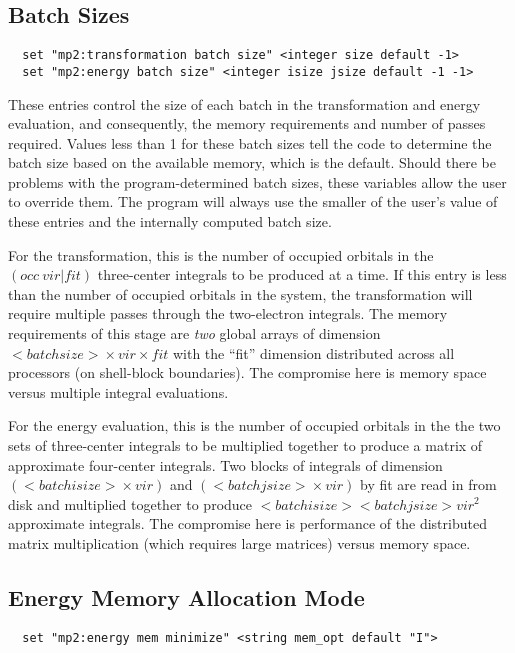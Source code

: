 \subsection{Batch Sizes}

\begin{verbatim}
  set "mp2:transformation batch size" <integer size default -1>
  set "mp2:energy batch size" <integer isize jsize default -1 -1>
\end{verbatim}

These entries control the size of each batch in the transformation and
energy evaluation, and consequently, the memory requirements and
number of passes required.  Values less than 1 for these batch sizes
tell the code to determine the batch size based on the available
memory, which is the default.  Should there be problems with the
program-determined batch sizes, these variables allow the user to
override them.  The program will always use the smaller of the user's
value of these entries and the internally computed batch size.

For the transformation, this is the number of occupied orbitals in the
$({occ}\ {vir} | {fit})$ three-center integrals to
be produced at a time.  If this entry is less than the number of occupied
orbitals in the system, the transformation will require multiple
passes through the two-electron integrals.  The memory requirements of
this stage are {\em two} global arrays of dimension ${<batch
size>}\times {vir} \times {fit}$ with the ``fit''
dimension distributed across all processors (on shell-block
boundaries).  The compromise here is memory space versus multiple
integral evaluations.

For the energy evaluation, this is the number of occupied orbitals in
the the two sets of three-center integrals to be multiplied together
to produce a matrix of approximate four-center integrals.  Two blocks
of integrals of dimension $({<batch isize>}\times {vir})$ and
$({<batch jsize>}\times {vir})$ by fit are read in from disk and
multiplied together to produce $<batch isize> <batch jsize> {vir}^2$
approximate integrals.  The compromise here is performance of the
distributed matrix multiplication (which requires large matrices)
versus memory space.

\subsection{Energy Memory Allocation Mode}

\begin{verbatim}
  set "mp2:energy mem minimize" <string mem_opt default "I">
\end{verbatim}


